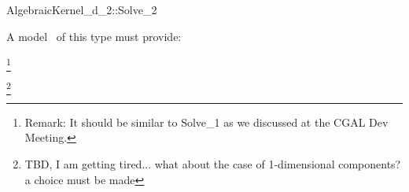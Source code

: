 \begin{ccRefConcept}{AlgebraicKernel_d_2::Solve_2}

\ccDefinition


A model \ccVar\ of this type must provide:

\footnote{Remark: It should be similar to Solve_1 as we discussed at the CGAL
Dev Meeting.}

\footnote{TBD, I am getting tired... what about the case of 1-dimensional components? a choice must be made}

\end{ccRefConcept}
